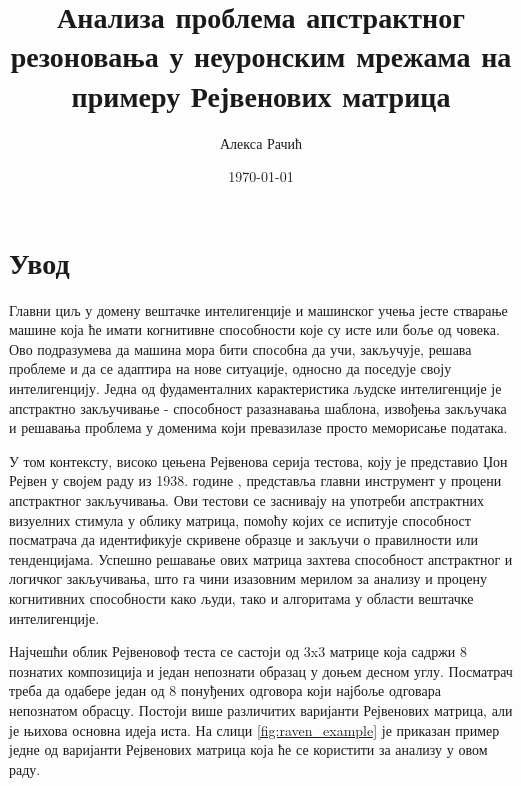 \documentclass[a4paper, 12pt, master, utf8]{etf}
\author{Алекса Рачић}
\date{\today}
\title{Анализа проблема апстрактног резоновања у неуронским мрежама на примеру Рејвенових матрица}
\begin{document}
\maketitle

\tableofcontents

\onehalfspacing
\newpage

\chapter{Увод}
\label{sec:1}

Главни циљ у домену вештачке интелигенције и машинског учења јесте стварање машине која ће имати когнитивне способности које су исте или боље од човека. Ово подразумева да машина мора бити способна да учи, закључује, решава проблеме и да се адаптира на нове ситуације, односно да поседује своју интелигенцију.
Једна од фудаменталних карактеристика људске интелигенције је апстрактно закључивање - способност разазнавања шаблона, извођења закључака и решавања проблема у доменима који превазилазе просто меморисање података.
\newline

У том контексту, високо цењена Рејвенова серија тестова, коју је представио Џон Рејвен у својем раду из 1938. године \cite{raven1938raven}, представља главни инструмент у процени апстрактног закључивања. Ови тестови се заснивају на употреби апстрактних визуелних стимула у облику матрица, 
помоћу којих се испитује способност посматрача да идентификује скривене образце и закључи о правилности или тенденцијама. Успешно решавање ових матрица захтева способност апстрактног и логичког закључивања, што га чини изазовним мерилом за анализу и процену когнитивних способности како људи, тако и алгоритама у области вештачке интелигенције.
\newline 

Најчешћи облик Рејвеновоф теста се састоји од 3x3 матрице која садржи 8 познатих композиција и један непознати образац у доњем десном углу. Посматрач треба да одабере један од 8 понуђених одговора који најбоље одговара непознатом обрасцу. Постоји више различитих варијанти Рејвенових матрица, али је њихова основна идеја иста. На слици \ref{fig:raven_example} 
је приказан пример једне од варијанти Рејвенових матрица која ће се користити за анализу у овом раду.
\newline
\end{document}
